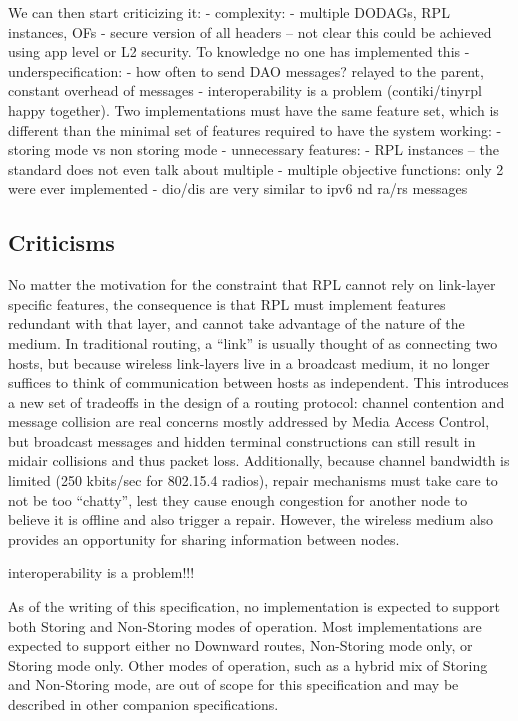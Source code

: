 We can then start criticizing it:
- complexity:
  - multiple DODAGs, RPL instances, OFs
  - secure version of all headers -- not clear this could be achieved using app level
    or L2 security. To knowledge no one has implemented this
- underspecification:
  - how often to send DAO messages? relayed to the parent, constant overhead of messages
  - interoperability is a problem (contiki/tinyrpl happy together). Two implementations
    must have the same feature set, which is different than the minimal set of features
    required to have the system working:
    - storing mode vs non storing mode
- unnecessary features:
  - RPL instances -- the standard does not even talk about multiple
  - multiple objective functions: only 2 were ever implemented
  - dio/dis are very similar to ipv6 nd ra/rs messages
\fi

\subsection{Criticisms}

No matter the motivation for the constraint that RPL cannot rely on link-layer specific features, the consequence is that RPL must implement features redundant with that layer, and cannot take advantage of the nature of the medium.
In traditional routing, a ``link'' is usually thought of as connecting two hosts, but because wireless link-layers live in a broadcast medium, it no longer suffices to think of communication between hosts as independent.
This introduces a new set of tradeoffs in the design of a routing protocol: channel contention and message collision are real concerns mostly addressed by Media Access Control, but broadcast messages and hidden terminal constructions can still result in midair collisions and thus packet loss.
Additionally, because channel bandwidth is limited (250 kbits/sec for 802.15.4 radios), repair mechanisms must take care to not be too ``chatty'', lest they cause enough congestion for another node to believe it is offline and also trigger a repair.
However, the wireless medium also provides an opportunity for sharing information between nodes.

interoperability is a problem!!!

As of the writing of this specification, no implementation is
expected to support both Storing and Non-Storing modes of operation.
Most implementations are expected to support either no Downward
routes, Non-Storing mode only, or Storing mode only.  Other modes of
operation, such as a hybrid mix of Storing and Non-Storing mode, are
out of scope for this specification and may be described in other
companion specifications.
\fi


